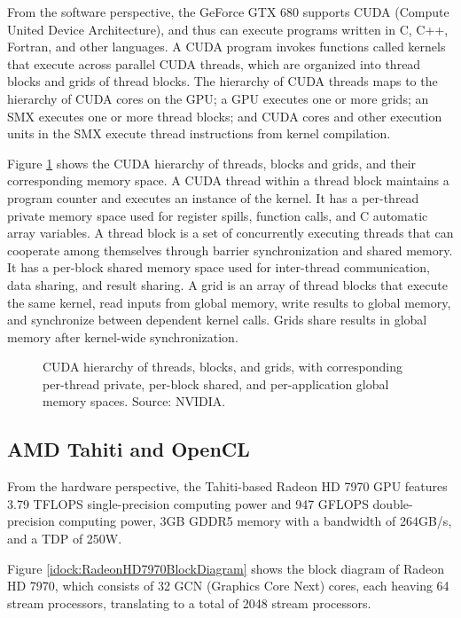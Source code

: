 From the software perspective, the GeForce GTX 680 supports CUDA (Compute United Device Architecture), and thus can execute programs written in C, C++, Fortran, and other languages. A CUDA program invokes functions called kernels that execute across parallel CUDA threads, which are organized into thread blocks and grids of thread blocks. The hierarchy of CUDA threads maps to the hierarchy of CUDA cores on the GPU; a GPU executes one or more grids; an SMX executes one or more thread blocks; and CUDA cores and other execution units in the SMX execute thread instructions from kernel compilation.

Figure \ref{idock:CUDAMemoryHierarchy} shows the CUDA hierarchy of threads, blocks and grids, and their corresponding memory space. A CUDA thread within a thread block maintains a program counter and executes an instance of the kernel. It has a per-thread private memory space used for register spills, function calls, and C automatic array variables. A thread block is a set of concurrently executing threads that can cooperate among themselves through barrier synchronization and shared memory. It has a per-block shared memory space used for inter-thread communication, data sharing, and result sharing. A grid is an array of thread blocks that execute the same kernel, read inputs from global memory, write results to global memory, and synchronize between dependent kernel calls. Grids share results in global memory after kernel-wide synchronization.

\begin{figure}
\centering
\caption{CUDA hierarchy of threads, blocks, and grids, with corresponding per-thread private, per-block shared, and per-application global memory spaces. Source: NVIDIA.}
\label{idock:CUDAMemoryHierarchy}
\end{figure}

\subsection{AMD Tahiti and OpenCL}

From the hardware perspective, the Tahiti-based Radeon HD 7970 GPU features 3.79 TFLOPS single-precision computing power and 947 GFLOPS double-precision computing power, 3GB GDDR5 memory with a bandwidth of 264GB/s, and a TDP of 250W.

Figure \ref{idock:RadeonHD7970BlockDiagram} shows the block diagram of Radeon HD 7970, which consists of 32 GCN (Graphics Core Next) cores, each heaving 64 stream processors, translating to a total of 2048 stream processors.


